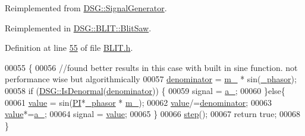 Reimplemented from \hyperlink{class_d_s_g_1_1_signal_generator_a46fe75a81a242e191c5049d33ddf4155}{D\+S\+G\+::\+Signal\+Generator}.



Reimplemented in \hyperlink{class_d_s_g_1_1_b_l_i_t_1_1_blit_saw_ae24821c51b23b9fe9220a620e558af04}{D\+S\+G\+::\+B\+L\+I\+T\+::\+Blit\+Saw}.



Definition at line \hyperlink{_b_l_i_t_8h_source_l00055}{55} of file \hyperlink{_b_l_i_t_8h_source}{B\+L\+I\+T.\+h}.


\begin{DoxyCode}
00055                                                             \{
00056             \textcolor{comment}{//found better results in this case with built in sine function. not performance wise but
       algorithmically}
00057             \hyperlink{class_d_s_g_1_1_b_l_i_t_1_1_blit_a6de89a5a240f226c940aef97661c9cee}{denominator} = \hyperlink{class_d_s_g_1_1_b_l_i_t_1_1_blit_afa6e4d46efdbfa032762610601ed42a0}{m\_} * sin(\hyperlink{class_d_s_g_1_1_phasor_a82c148d71128cfc518fc8e7e131c3a38}{\_phasor});
00058             \textcolor{keywordflow}{if} (\hyperlink{namespace_d_s_g_a9eee3c39a1f45d42f0b4fa7201d3ba3d}{DSG::IsDenormal}(\hyperlink{class_d_s_g_1_1_b_l_i_t_1_1_blit_a6de89a5a240f226c940aef97661c9cee}{denominator})) \{
00059                 signal = \hyperlink{class_d_s_g_1_1_b_l_i_t_1_1_blit_a66e2a97840ad0772daaaa9aea63b77b4}{a\_};
00060             \}\textcolor{keywordflow}{else}\{
00061                 \hyperlink{class_d_s_g_1_1_b_l_i_t_1_1_blit_ac8fb9d4fb45d0697bf364bb5d6b570ce}{value} = sin(\hyperlink{_p_i_8h_a598a3330b3c21701223ee0ca14316eca}{PI}*\hyperlink{class_d_s_g_1_1_phasor_a82c148d71128cfc518fc8e7e131c3a38}{\_phasor} * \hyperlink{class_d_s_g_1_1_b_l_i_t_1_1_blit_afa6e4d46efdbfa032762610601ed42a0}{m\_});
00062                 \hyperlink{class_d_s_g_1_1_b_l_i_t_1_1_blit_ac8fb9d4fb45d0697bf364bb5d6b570ce}{value}/=\hyperlink{class_d_s_g_1_1_b_l_i_t_1_1_blit_a6de89a5a240f226c940aef97661c9cee}{denominator};
00063                 \hyperlink{class_d_s_g_1_1_b_l_i_t_1_1_blit_ac8fb9d4fb45d0697bf364bb5d6b570ce}{value}*=\hyperlink{class_d_s_g_1_1_b_l_i_t_1_1_blit_a66e2a97840ad0772daaaa9aea63b77b4}{a\_};
00064                 signal = \hyperlink{class_d_s_g_1_1_b_l_i_t_1_1_blit_ac8fb9d4fb45d0697bf364bb5d6b570ce}{value};
00065             \}
00066             \hyperlink{class_d_s_g_1_1_phasor_a6a088b29e506fb5e99d73f4f0160c583}{step}();
00067             \textcolor{keywordflow}{return} \textcolor{keyword}{true};
00068         \}
\end{DoxyCode}
